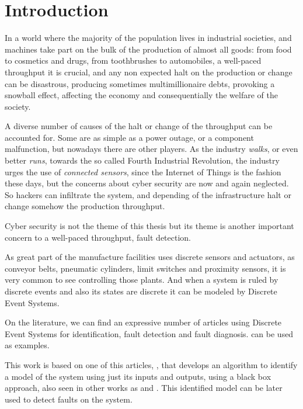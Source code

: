 
\chapter{Introduction}
In a world where the majority of the population lives in industrial societies,
and machines take part on the bulk of the production of almost all goods: from
food to cosmetics and drugs, from toothbrushes to automobiles, 
a well-paced throughput it is crucial, and any non expected halt on the
production or change can be disastrous, producing sometimes multimillionaire debts,
provoking a snowball effect, affecting the economy and consequentially the welfare of the society.

A diverse number of causes of the halt or change of the throughput can be
accounted for. Some are as simple as a power outage, or a component malfunction,
but nowadays there are other players. As the industry \textsl{walks}, or even
better \textsl{runs}, towards the so called Fourth Industrial Revolution, the industry
urges the use of \textit{connected sensors}, since the Internet of Things is the
fashion these days, but the concerns about cyber security are now and again neglected.   
So hackers can infiltrate the system, and depending of the infrastructure
halt or change somehow the production throughput.

Cyber security is not the theme of this thesis but its theme is another important concern to a
well-paced throughput, fault detection.

As great part of the manufacture facilities uses discrete sensors and actuators,
as conveyor belts, pneumatic cylinders, limit switches and proximity sensors, it is very common to see 
\PLCs controlling those plants. And when a system is ruled by discrete events
and also its states are discrete it can be modeled by Discrete Event
Systems.  

On the literature, we can find an expressive number of articles using Discrete
Event Systems for identification, fault detection and fault
diagnosis. \cite{veras2018distributed,cabral2017synchronous,kumar2014comments,klein2005fault}  
can be used as examples.

This work is based on one of this articles, \cite{moreira2018enhanced}, that
develops an algorithm to identify a model of the system using just its inputs
and outputs, using a black box approach, also seen in other works as
\cite{klein2005fault} and \cite{roth2009fdi}. This identified model can be later
used to detect faults on the system.


